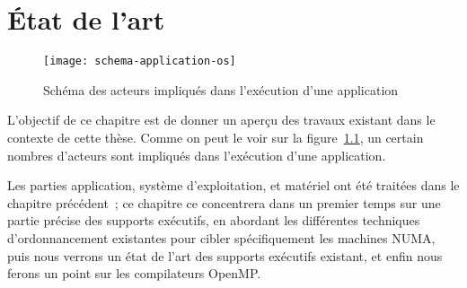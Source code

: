 \chapter{État de l'art}\label{chap:rw}
\chaptertoc


\begin{figure}[ht]
  \centering
  \texttt{[image: schema-application-os]}
  \caption{Schéma des acteurs impliqués dans l'exécution d'une application}\label{fig:rw:application-os}
\end{figure}

L'objectif de ce chapitre est de donner un aperçu des travaux existant dans le contexte de cette thèse.
Comme on peut le voir sur la figure~\ref{fig:rw:application-os}, un certain nombres d'acteurs sont impliqués dans l'exécution d'une application.

Les parties application, système d'exploitation, et matériel ont été traitées dans le chapitre précédent~; ce chapitre ce concentrera dans un premier temps sur une partie précise des supports exécutifs, en abordant les différentes techniques d'ordonnancement existantes pour cibler spécifiquement les machines NUMA, puis nous verrons un état de l'art des supports exécutifs existant, et enfin nous ferons un point sur les compilateurs OpenMP.

















